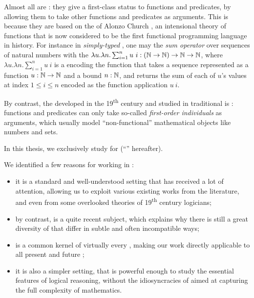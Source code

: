 \AP Almost all  are : they give a
first-class status to functions and predicates, by allowing them to take other
functions and predicates as arguments. This is because they are based on the
 of Alonzo Church
, an intensional theory of
 functions that is now considered to be the first functional
programming language in history. For instance in \emph{simply-typed}
 , one may
 the \emph{sum operator} over sequences of natural numbers with the
 $\lambda u. \lambda n. \sum_{i = 1}^{n}{u~i} : (\mathbb{N} \to \mathbb{N}) \to
\mathbb{N} \to \mathbb{N}$, where $\lambda u. \lambda n. \sum_{i = 1}^{n}{u~i}$ is a
 encoding the  function that takes a
sequence represented as a function $u : \mathbb{N} \to \mathbb{N}$ and a bound $n :
\mathbb{N}$, and returns the sum of each of $u$'s values at index $1 \leq i \leq n$
encoded as the function application $u~i$.

\AP By contrast, the  developed in the
19\textsuperscript{th} century and studied in traditional  is
: functions and predicates can only take so-called
\emph{first-order individuals} as arguments, which usually model
``non-functional'' mathematical objects like numbers and sets.

\begin{emphpar}
In this thesis, we exclusively study  for
\emph{}  (``'' hereafter).
\end{emphpar}

We identified a few reasons for working in :
\begin{itemize}
  \item it is a standard and well-understood setting that has received a lot of
  attention, allowing us to exploit various existing works from the  literature, and even from some overlooked theories of
  19\textsuperscript{th} century logicians;
  \item by contrast,  is a quite recent subject, which explains why there is still a
  great diversity of  that differ in subtle and often incompatible
  ways;
  \item {} is a common kernel of virtually every , making our work
  directly applicable to all present and future ;
  \item it is also a simpler setting, that is powerful enough to study the
  essential features of logical reasoning, without the idiosyncracies of  aimed at capturing the full complexity of mathematics.
\end{itemize}

